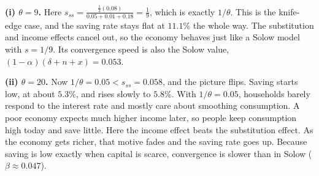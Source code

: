 \documentclass[11pt]{article}
\begin{document}
\textbf{(i) $\theta=9$.} Here $s_{ss} = \frac{\frac13(0.08)}{0.05+0.01+0.18} = \frac19$, which is exactly
$1/\theta$. This is the knife-edge case, and the saving rate stays flat at $11.1\%$ the whole way. The
substitution and income effects cancel out, so the economy behaves just like a Solow model with
$s=1/9$. Its convergence speed is also the Solow value, $(1-\alpha)(\delta+n+x)=0.053$.

\textbf{(ii) $\theta=20$.} Now $1/\theta = 0.05 < s_{ss} = 0.058$, and the picture flips. Saving starts
low, at about $5.3\%$, and rises slowly to $5.8\%$. With $1/\theta = 0.05$, households barely respond to
the interest rate and mostly care about smoothing consumption. A poor economy expects much higher income
later, so people keep consumption high today and save little. Here the income effect beats the
substitution effect. As the economy gets richer, that motive fades and the saving rate goes up. Because
saving is low exactly when capital is scarce, convergence is slower than in Solow ($\beta\approx0.047$).
\end{document}

